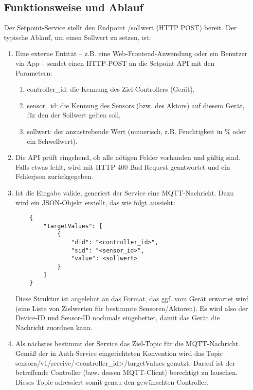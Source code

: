 \subsection{Funktionsweise und Ablauf}
Der Setpoint-Service stellt den Endpoint /sollwert (HTTP POST) bereit. Der typische Ablauf, um einen Sollwert zu setzen, ist:
\begin{enumerate}
    \item Eine externe Entität – z.B. eine Web-Frontend-Anwendung oder ein Benutzer via App – sendet einen HTTP-POST an die Setpoint API mit den Parametern:
    \begin{enumerate}
        \item controller\_id: die Kennung des Ziel-Controllers (Gerät),
        \item sensor\_id: die Kennung des Sensors (bzw. des Aktors) auf diesem Gerät, für den der Sollwert gelten soll,
        \item sollwert: der anzustrebende Wert (numerisch, z.B. Feuchtigkeit in \% oder ein Schwellwert).
    \end{enumerate}
    \item Die API prüft eingehend, ob alle nötigen Felder vorhanden und gültig sind. Falls etwas fehlt, wird mit HTTP 400 Bad Request geantwortet und ein Fehlerjson zurückgegeben.
    \item Ist die Eingabe valide, generiert der Service eine MQTT-Nachricht. Dazu wird ein JSON-Objekt erstellt, das wie folgt aussieht:
    \begin{lstlisting}
    {
        "targetValues": [
            {
                "did": "<controller_id>",
                "sid": "<sensor_id>",
                "value": <sollwert>
            }
        ]
    }
    \end{lstlisting}
    Diese Struktur ist angelehnt an das Format, das ggf. vom Gerät erwartet wird (eine Liste von Zielwerten für bestimmte Sensoren/Aktoren). Es wird also der Device-ID und Sensor-ID nochmals eingebettet, damit das Gerät die Nachricht zuordnen kann.
    \item Als nächstes bestimmt der Service das Ziel-Topic für die MQTT-Nachricht. Gemäß der in Auth-Service eingerichteten Konvention wird das Topic \\ sensora/v1/receive/<controller\_id>/targetValues genutzt. Darauf ist der betreffende Controller (bzw. dessen MQTT-Client) berechtigt zu lauschen. Dieses Topic adressiert somit genau den gewünschten Controller.

\end{enumerate}
